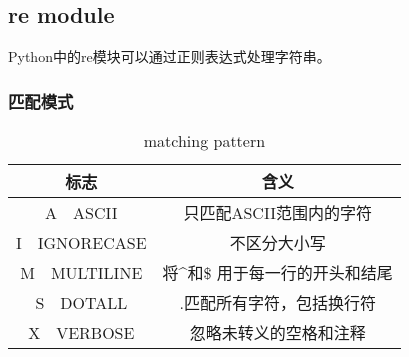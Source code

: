 \documentclass{article}
\begin{document}
    \subsection{re module}
      Python中的re模块可以通过正则表达式处理字符串。
      \subsubsection{匹配模式}
        \begin{table}[H]
          \centering
          \caption{matching pattern}
          \label{tab:matching pattern}
          \begin{tabular}{cc}
            \toprule[1.5pt]
            标志 & 含义 \\
            \midrule
            A~~ASCII & 只匹配ASCII范围内的字符 \\
            I~~IGNORECASE & 不区分大小写 \\
            M~~MULTILINE & 将\^{}和\$ 用于每一行的开头和结尾 \\
            S~~DOTALL & .匹配所有字符，包括换行符 \\
            X~~VERBOSE & 忽略未转义的空格和注释 \\
            \bottomrule[1.5pt]
          \end{tabular}
        \end{table}
\end{document}
